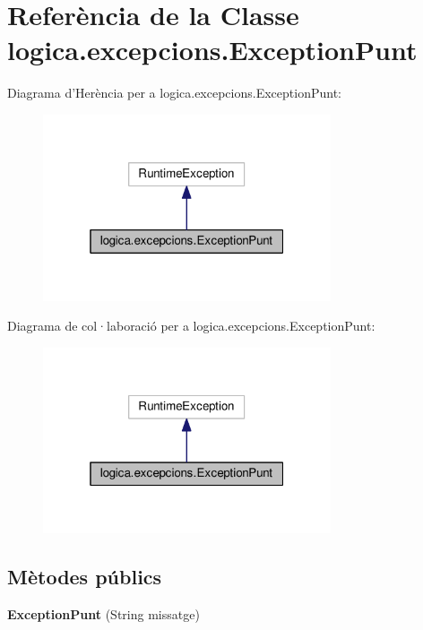 \hypertarget{classlogica_1_1excepcions_1_1_exception_punt}{\section{Referència de la Classe logica.\+excepcions.\+Exception\+Punt}
\label{classlogica_1_1excepcions_1_1_exception_punt}
}


Diagrama d'Herència per a logica.\+excepcions.\+Exception\+Punt\+:\nopagebreak
\begin{figure}[H]
\begin{center}
\leavevmode
\includegraphics[width=241pt]{classlogica_1_1excepcions_1_1_exception_punt__inherit__graph}
\end{center}
\end{figure}


Diagrama de col·laboració per a logica.\+excepcions.\+Exception\+Punt\+:\nopagebreak
\begin{figure}[H]
\begin{center}
\leavevmode
\includegraphics[width=241pt]{classlogica_1_1excepcions_1_1_exception_punt__coll__graph}
\end{center}
\end{figure}
\subsection*{Mètodes públics}
\begin{DoxyCompactItemize}
\item 
\hypertarget{classlogica_1_1excepcions_1_1_exception_punt_a7882d4318b04f3a5eb1a5f76a1ba31bc}{{\bfseries Exception\+Punt} (String missatge)}\label{classlogica_1_1excepcions_1_1_exception_punt_a7882d4318b04f3a5eb1a5f76a1ba31bc}

\end{DoxyCompactItemize}


